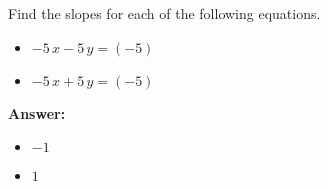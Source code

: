  Find the slopes for each of the following equations. \begin{itemize}\item \( -5 \, x - 5 \, y = \left(-5\right) \)\item \( -5 \, x + 5 \, y = \left(-5\right) \)\end{itemize}

        \textbf{Answer:} \begin{itemize}\item \( -1 \)\item \( 1 \)\end{itemize}
